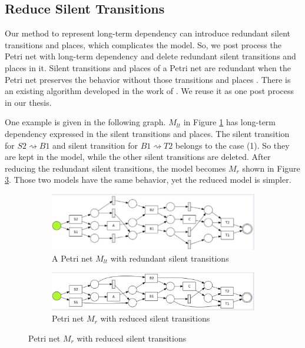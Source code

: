 \subsection{Reduce Silent Transitions}
Our method to represent long-term dependency can introduce redundant silent transitions and places, which complicates the model. So, we post process the Petri net with long-term dependency and delete redundant silent transitions and places in it. 
Silent transitions and places of a Petri net are redundant when the Petri net preserves the behavior without those transitions and places \cite{murata1989petri, verbeek2017decomposed}. There is an existing algorithm developed in the work of \cite{verbeek2017decomposed}. We reuse it as one post process in our thesis. 

One example is given in the following graph. $M_{lt}$ in Figure \ref{fig:with-lt} has long-term dependency expressed in the silent transitions and places. The silent transition for $S2 \rightsquigarrow B1 $ and silent transition for $B1 \rightsquigarrow T2$ belongs to the case (1). So they are kept in the model, while the other silent transitions are deleted. After reducing the redundant silent transitions, the model becomes $M_r$ shown in Figure \ref{fig:reduced-lt}. Those two models have the same behavior, yet the reduced model is simpler.
\begin{figure}[!h]
	\centering
	\begin{subfigure}[a]{\textwidth}
		\includegraphics[width=\textwidth]{figures/algorithm/dfg-IM-pn-with-lt.png}
		
		\caption{A Petri net $M_{lt}$ with redundant silent transitions}
		\label{fig:with-lt}
	\end{subfigure}
	\hfill
	\begin{subfigure}[b]{\textwidth}
		\centering
		\includegraphics[width=\linewidth]{figures/algorithm/dfg-IM-pn-with-lt-reduced.png}
		
		\caption{Petri net $M_r$ with reduced silent transitions}
		\label{fig:reduced-lt}
	\end{subfigure}
\end{figure}
